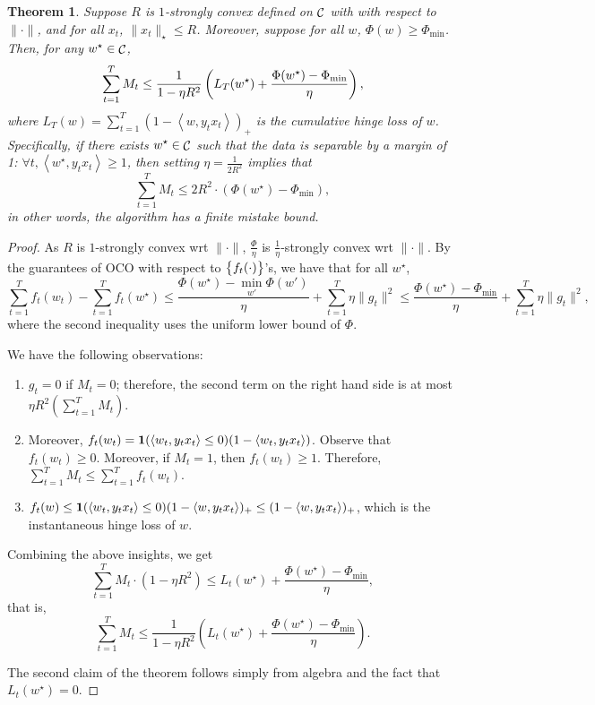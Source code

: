 \documentclass{article}
\newtheorem{theorem}{Theorem}
\DeclareMathOperator*{\Ccal}{{\cal C}}
\newcommand*{\one}{{\bf 1}}
\newcommand{\inner}[2]{\left\langle #1,#2 \right\rangle}
\begin{document}
\begin{theorem}
Suppose $R$ is $1$-strongly convex defined on $\Ccal$ with
with respect to $\| \cdot \|$, and for all $x_t$, $\| x_t \|_\star \leq R$.
Moreover, suppose for all $w$, $\Phi(w) \geq \Phi_{\min}$.
Then, for any $w^\star \in \Ccal$,
\[ \sum_{t=1}^T M_t \leq \frac{1}{1-\eta R^2} \del{L_T(w^\star) + \frac{\Phi(w^\star) - \Phi_{\min}}{\eta}}, \]
where $L_T(w) = \sum_{t=1}^T (1 - \inner{w}{y_t x_t})_+$ is the cumulative hinge loss of $w$.
Specifically, if there exists $w^\star \in \Ccal$ such that the data is separable by a margin of 1: $\forall t, \inner{w^\star}{y_t x_t} \geq 1$, then setting $\eta = \frac{1}{2R^2}$ implies that
\[ \sum_{t=1}^T M_t \leq 2R^2 \cdot (\Phi(w^\star) - \Phi_{\min}), \]
in other words, the algorithm has a finite mistake bound.
\label{thm:ol-oc}
\end{theorem}

\begin{proof}
As $R$ is $1$-strongly convex wrt $\| \cdot \|$, $\frac{\Phi}{\eta}$ is $\frac1\eta$-strongly convex wrt $\| \cdot \|$.
By the guarantees of OCO with respect to $\cbr{f_t(\cdot)}$'s, we have that for all $w^\star$,
\[ \sum_{t=1}^T f_t(w_t) - \sum_{t=1}^T f_t(w^\star) \leq \frac{\Phi(w^\star) - \min_{w'}\Phi(w')}{\eta} + \sum_{t=1}^T \eta \|g_t\|^2 \leq \frac{\Phi(w^\star) - \Phi_{\min}}{\eta} + \sum_{t=1}^T \eta \|g_t\|^2, \]
where the second inequality uses the uniform lower bound of $\Phi$.

We have the following observations:
\begin{enumerate}
\item $g_t = 0$ if $M_t = 0$; therefore, the second term on the right hand side is at most $\eta R^2 (\sum_{t=1}^T M_t)$.

\item Moreover, $f_t(w_t) = \one(\inner{w_t}{y_t x_t} \leq 0)(1 - \inner{w_t}{y_t x_t})$. Observe that $f_t(w_t) \geq 0$. Moreover, if $M_t = 1$, then $f_t(w_t) \geq 1$. Therefore, $\sum_{t=1}^T M_t \leq \sum_{t=1}^T f_t(w_t)$.

\item $f_t(w) \leq \one(\inner{w_t}{y_t x_t} \leq 0)(1 - \inner{w}{y_t x_t})_+ \leq (1 - \inner{w}{y_t x_t})_+$, which is the instantaneous hinge loss of $w$.
\end{enumerate}

Combining the above insights, we get
\[ \sum_{t=1}^T M_t \cdot (1 - \eta R^2) \leq L_t(w^\star) + \frac{\Phi(w^\star) - \Phi_{\min}}{\eta}, \]
that is,
\[ \sum_{t=1}^T M_t \leq \frac{1}{1-\eta R^2} (L_t(w^\star) + \frac{\Phi(w^\star) - \Phi_{\min}}{\eta}). \]

The second claim of the theorem follows simply from algebra and the fact that $L_t(w^\star) = 0$.
\end{proof}
\end{document}
